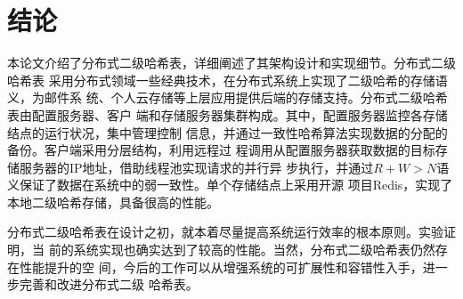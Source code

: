 \chapter{结论}\label{chapter:conclusion}
本论文介绍了分布式二级哈希表，详细阐述了其架构设计和实现细节。分布式二级哈希表
采用分布式领域一些经典技术，在分布式系统上实现了二级哈希的存储语义，为邮件系
统、个人云存储等上层应用提供后端的存储支持。分布式二级哈希表由配置服务器、客户
端和存储服务器集群构成。其中，配置服务器监控各存储结点的运行状况，集中管理控制
信息，并通过一致性哈希算法实现数据的分配的备份。客户端采用分层结构，利用远程过
程调用从配置服务器获取数据的目标存储服务器的IP地址，借助线程池实现请求的并行异
步执行，并通过$R+W>N$语义保证了数据在系统中的弱一致性。单个存储结点上采用开源
项目Redis，实现了本地二级哈希存储，具备很高的性能。

分布式二级哈希表在设计之初，就本着尽量提高系统运行效率的根本原则。实验证明，当
前的系统实现也确实达到了较高的性能。当然，分布式二级哈希表仍然存在性能提升的空
间，今后的工作可以从增强系统的可扩展性和容错性入手，进一步完善和改进分布式二级
哈希表。
